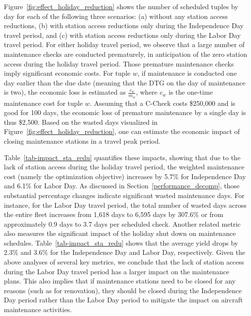 Figure~\ref{fig:effect_holiday_reduction} shows the number of scheduled tuples by day for each of the following three scenarios: (a) without any station access reductions, (b) with station access reductions only during the Independence Day travel period, and (c) with station access reductions only during the Labor Day travel period. For either holiday travel period, we observe that a large number of maintenance checks are conducted prematurely, in anticipation of the zero station access during the holiday travel period. Those premature maintenance checks imply significant economic costs. For tuple $w$, if maintenance is conducted  one day earlier than the due date (meaning that the DTG on the day of maintenance is two), the economic loss is estimated as $\frac{c_w}{m_w}$, where $c_w$ is the one-time maintenance cost for tuple $w$. Assuming that a C-Check costs \$250,000 \citep{ackert2010basics} and is good for 100 days, the economic loss of premature maintenance by a single day is thus \$2,500. Based on the wasted days visualized in Figure~\ref{fig:effect_holiday_reduction}, one can estimate the economic impact of closing maintenance stations in a travel peak period.


Table~\ref{tab-impact_sta_redu}  quantifies these impacts,  showing that due to the lack of station access during the holiday travel period, the weighted maintenance cost (namely the optimization objective) increases by 5.7\% for Independence Day and 6.1\% for Labor Day. As discussed in Section~\ref{performance_decomp}, those substantial percentage changes indicate significant wasted maintenance days. For instance, for the Labor Day travel period, the total number of wasted days across the entire fleet increases from 1,618  days to 6,595 days by 307.6\% or from approximately 0.9 days to 3.7 days per scheduled check. Another related metric also measures the significant impact of the holiday shut down on maintenance schedules. Table~\ref{tab-impact_sta_redu} shows that the average yield drops by 2.3\% and 3.6\% for the Independence Day and Labor Day, respectively. Given the above analyses of several key metrics, we conclude that the lack of station access during the Labor Day travel period has a larger impact on the maintenance plans. This also implies that if maintenance stations need to be closed for any reasons (such as for renovation), they should be closed during the Independence Day period rather than the Labor Day period to mitigate the impact on aircraft maintenance activities.

